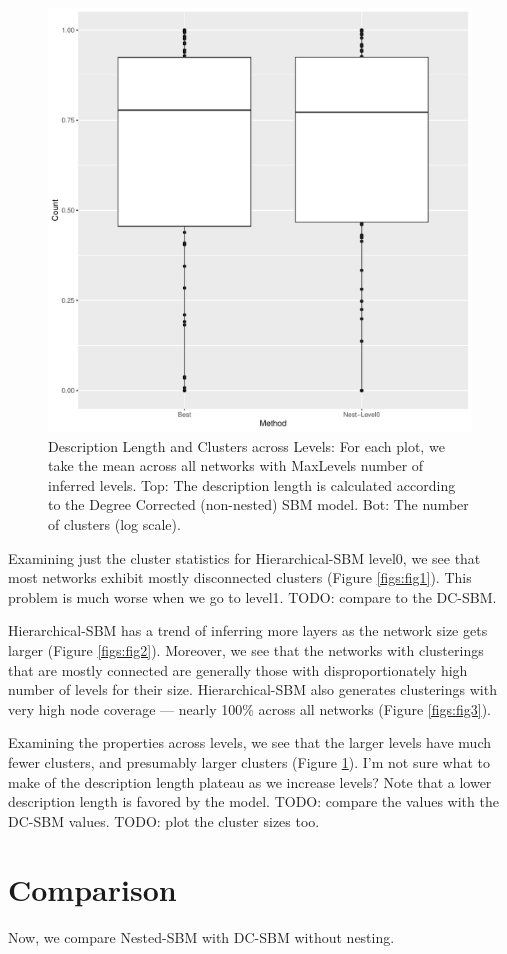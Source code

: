 \documentclass[aps,pre,superscriptaddress]{revtex4}
\begin{document}
\begin{figure}[ht]
	\includegraphics[width=\textwidth]{fig4.pdf}
	\caption{Description Length and Clusters across Levels:
		For each plot, we take the mean across all networks with MaxLevels number of inferred levels.
		Top: The description length is calculated according to the Degree Corrected (non-nested) SBM model.
		Bot: The number of clusters (log scale).}
	\label{figs:fig4}
\end{figure}

Examining just the cluster statistics for Hierarchical-SBM level0, we see that most networks exhibit mostly disconnected clusters (Figure \ref{figs:fig1}).
This problem is much worse when we go to level1.
TODO: compare to the DC-SBM.

Hierarchical-SBM has a trend of inferring more layers as the network size gets larger (Figure \ref{figs:fig2}).
Moreover, we see that the networks with clusterings that are mostly connected are generally those with disproportionately high number of levels for their size.
Hierarchical-SBM also generates clusterings with very high node coverage --- nearly 100\% across all networks (Figure \ref{figs:fig3}).

Examining the properties across levels, we see that the larger levels have much fewer clusters, and presumably larger clusters (Figure \ref{figs:fig4}).
I'm not sure what to make of the description length plateau as we increase levels?
Note that a lower description length is favored by the model.
TODO: compare the values with the DC-SBM values.
TODO: plot the cluster sizes too.

\section{Comparison}

Now, we compare Nested-SBM with DC-SBM without nesting.

\clearpage


\end{document}
